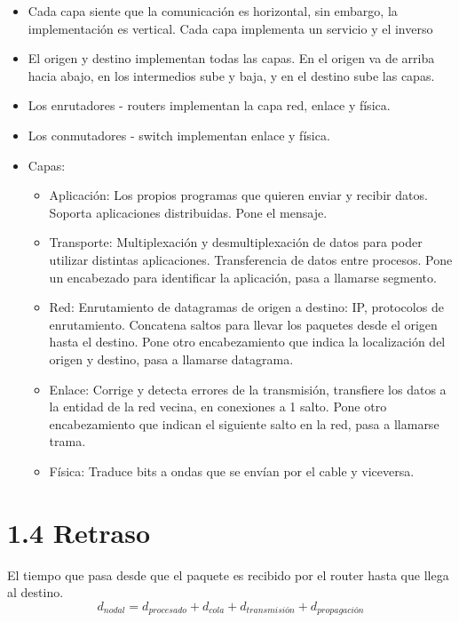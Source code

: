 \documentclass[12pt, twoside, openright]{report} %
\begin{document}
	\begin{itemize}
	\item
	Cada capa siente que la comunicación es horizontal, sin embargo, la
	implementación es vertical. Cada capa implementa un servicio y el
	inverso
	\item
	El origen y destino implementan todas las capas. En el origen va de
	arriba hacia abajo, en los intermedios sube y baja, y en el destino
	sube las capas.
	\item
	Los enrutadores - routers implementan la capa red, enlace y física.
	\item
	Los conmutadores - switch implementan enlace y física.
	\pagebreak
	\item
	Capas:

	\begin{itemize}
	\item
		Aplicación: Los propios programas que quieren enviar y recibir
		datos. Soporta aplicaciones distribuidas. Pone el mensaje.
	\item
		Transporte: Multiplexación y desmultiplexación de datos para poder
		utilizar distintas aplicaciones. Transferencia de datos entre
		procesos. Pone un encabezado para identificar la aplicación, pasa a
		llamarse segmento.
	\item
		Red: Enrutamiento de datagramas de origen a destino: IP, protocolos
		de enrutamiento. Concatena saltos para llevar los paquetes desde el
		origen hasta el destino. Pone otro encabezamiento que indica la
		localización del origen y destino, pasa a llamarse datagrama.
	\item
		Enlace: Corrige y detecta errores de la transmisión, transfiere los
		datos a la entidad de la red vecina, en conexiones a 1 salto. Pone
		otro encabezamiento que indican el siguiente salto en la red, pasa a
		llamarse trama.
	\item
		Física: Traduce bits a ondas que se envían por el cable y viceversa.
	\end{itemize}
	
	\end{itemize}


\section{1.4 Retraso}

El tiempo que pasa desde que el paquete es recibido por el router hasta
que llega al destino.
$$d_{nodal}= d_{procesado}+d_{cola}+d_{transmisión}+d_{propagación}$$
\end{document}
